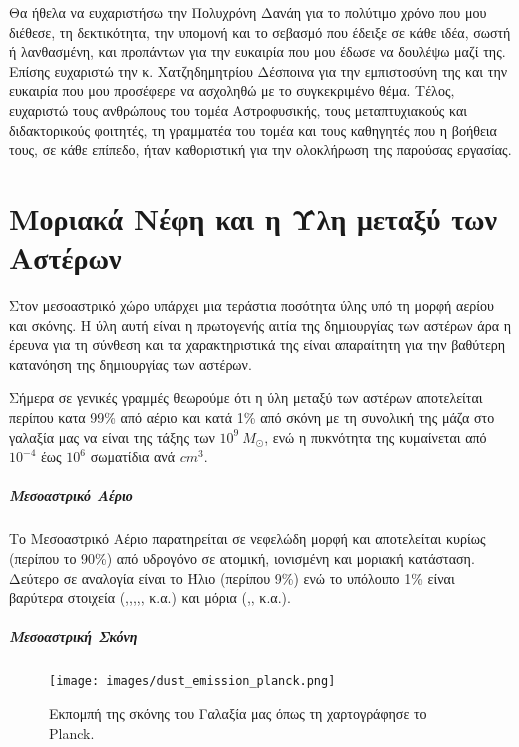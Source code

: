 \documentclass[a4paper,12pt]{memoir}
\begin{document}
Θα ήθελα να ευχαριστήσω την Πολυχρόνη Δανάη για το πολύτιμο χρόνο που μου διέθεσε, τη δεκτικότητα, την υπομονή και το σεβασμό που έδειξε σε κάθε ιδέα, σωστή ή λανθασμένη, και προπάντων για την ευκαιρία που μου έδωσε να δουλέψω μαζί της.
Επίσης ευχαριστώ την κ. Χατζηδημητρίου Δέσποινα για την εμπιστοσύνη της και την ευκαιρία που μου προσέφερε να ασχοληθώ με το συγκεκριμένο θέμα.
Τέλος, ευχαριστώ τους ανθρώπους του τομέα Αστροφυσικής, τους μεταπτυχιακούς και διδακτορικούς φοιτητές, τη γραμματέα του τομέα και τους καθηγητές που η βοήθεια τους, σε κάθε επίπεδο, ήταν καθοριστική για την ολοκλήρωση της παρούσας εργασίας.

\chapter{Μοριακά Νέφη και η Ύλη μεταξύ των Αστέρων}

Στον μεσοαστρικό χώρο υπάρχει μια τεράστια ποσότητα ύλης υπό τη μορφή αερίου και σκόνης. Η ύλη αυτή είναι η πρωτογενής αιτία της δημιουργίας των αστέρων άρα η έρευνα για τη σύνθεση και τα χαρακτηριστικά της είναι απαραίτητη για την βαθύτερη κατανόηση της δημιουργίας των αστέρων.

Σήμερα σε γενικές γραμμές θεωρούμε ότι η ύλη μεταξύ των αστέρων αποτελείται περίπου κατα 99\% από αέριο και κατά 1\% από σκόνη με τη συνολική της μάζα στο γαλαξία μας να είναι της τάξης των $10^9\ M_{\odot}$, ενώ η πυκνότητα της κυμαίνεται από $10^{-4}$ έως $10^{6}$ σωματίδια ανά $cm^3$.

\paragraph{Μεσοαστρικό Αέριο} 
Το Μεσοαστρικό Αέριο παρατηρείται σε νεφελώδη μορφή και αποτελείται κυρίως (περίπου το 90\%) από υδρογόνο σε ατομική, ιονισμένη και μοριακή κατάσταση. Δεύτερο σε αναλογία είναι το Ήλιο (περίπου 9\%) ενώ το υπόλοιπο 1\% είναι βαρύτερα στοιχεία (,,,,, κ.α.) και μόρια (,, κ.α.).

\paragraph{Μεσοαστρική Σκόνη}
\begin{figure}[h]
	\centering
	\texttt{[image: images/dust\_emission\_planck.png]}
	\caption{Εκπομπή της σκόνης του Γαλαξία μας όπως τη χαρτογράφησε το Planck.\cite{planck_2014}}
\end{figure}
\end{document}
